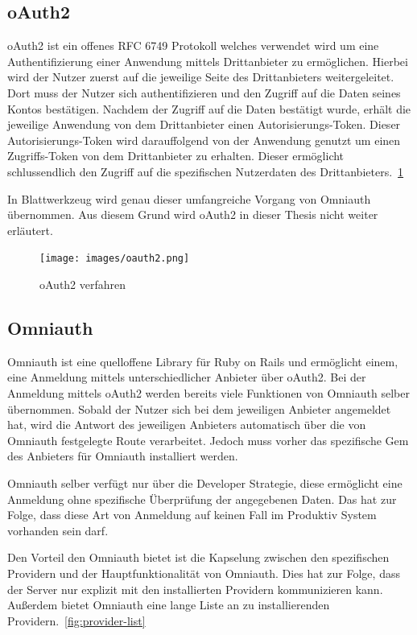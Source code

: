 \documentclass[11pt]{article}
\begin{document}
	\subsection{oAuth2}
	\label{sec: oauth2}
	\gls{oAuth2} ist ein offenes \gls{RFC} 6749 Protokoll welches verwendet wird um eine Authentifizierung einer Anwendung mittels Drittanbieter zu ermöglichen. Hierbei wird der Nutzer zuerst auf die jeweilige Seite des Drittanbieters weitergeleitet. Dort muss der Nutzer sich authentifizieren und den Zugriff auf die Daten seines Kontos bestätigen. Nachdem der Zugriff auf die Daten bestätigt wurde, erhält die jeweilige Anwendung von dem Drittanbieter einen Autorisierungs-Token. Dieser Autorisierungs-Token wird darauffolgend von der Anwendung genutzt um einen Zugriffs-Token von dem Drittanbieter zu erhalten. Dieser ermöglicht schlussendlich den Zugriff auf die spezifischen Nutzerdaten des Drittanbieters.~\ref{fig:oauth2}
	
	In Blattwerkzeug wird genau dieser umfangreiche Vorgang von Omniauth übernommen. Aus diesem Grund wird oAuth2 in dieser Thesis nicht weiter erläutert.
	
	\begin{figure}[h]
		\texttt{[image: images/oauth2.png]}
		\caption{oAuth2 verfahren}
		\label{fig:oauth2}
	\end{figure}

	\subsection{Omniauth}
	\label{sec: omniauth}
	Omniauth ist eine quelloffene Library für Ruby on Rails und ermöglicht einem, eine Anmeldung mittels unterschiedlicher Anbieter über \gls{oAuth2}. Bei der Anmeldung mittels oAuth2 werden bereits viele Funktionen von Omniauth selber übernommen. Sobald der Nutzer sich bei dem jeweiligen Anbieter angemeldet hat, wird die Antwort des jeweiligen Anbieters automatisch über die von Omniauth festgelegte Route verarbeitet. Jedoch muss vorher das spezifische Gem des Anbieters für Omniauth installiert werden.
	
	Omniauth selber verfügt nur über die Developer Strategie, diese ermöglicht eine Anmeldung ohne spezifische Überprüfung der angegebenen Daten. Das hat zur Folge, dass diese Art von Anmeldung auf keinen Fall im Produktiv System vorhanden sein darf.
	
	Den Vorteil den Omniauth bietet ist die Kapselung zwischen den spezifischen Providern und der Hauptfunktionalität von Omniauth. Dies hat zur Folge, dass der Server nur explizit mit den installierten Providern kommunizieren kann. Außerdem bietet Omniauth eine lange Liste an zu installierenden Providern.~\ref{fig:provider-list}
	
\end{document}
